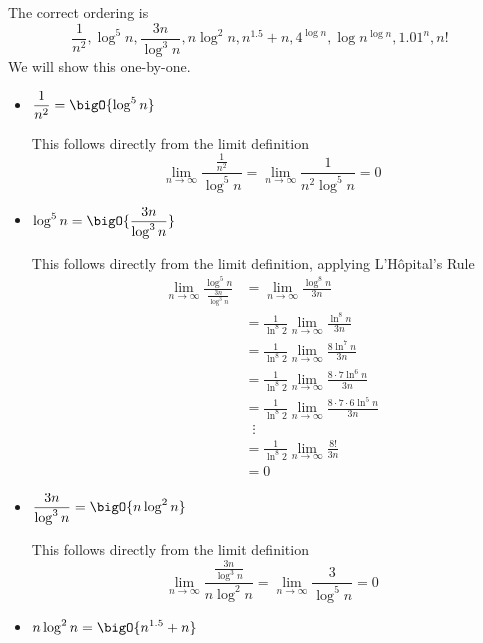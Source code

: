 \documentclass[draft]{article}
\begin{document}
\begin{solution}
    The correct ordering is \[\frac{1}{n^2}, \log^5{n}, \frac{3n}{\log^3{n}}, n\log^2{n}, n^{1.5} + n, 4^{\log{n}}, \log{n}^{\log{n}}, {1.01}^n, n!\]
    We will show this one-by-one.
    \begin{itemize}
        \item $\displaystyle\frac{1}{n^2} = \bigO{\log^5{n}}$

              This follows directly from the limit definition \[\lim_{n\to\infty}\frac{\frac{1}{n^2}}{\log^5{n}} = \lim_{n\to\infty}\frac{1}{n^2\log^5{n}} = 0\]

        \item $\displaystyle\log^5{n} = \bigO{\frac{3n}{\log^3{n}}}$

              This follows directly from the limit definition, applying L'H\^{o}pital's Rule
              \begin{align*}\lim_{n\to\infty}\frac{\log^5{n}}{\frac{3n}{\log^3{n}}}
                   & = \lim_{n\to\infty}\frac{\log^8{n}}{3n}                               \\
                   & = \frac{1}{\ln^8{2}}\lim_{n\to\infty}\frac{\ln^8{n}}{3n}              \\
                   & = \frac{1}{\ln^8{2}}\lim_{n\to\infty}\frac{8\ln^7{n}}{3n}             \\
                   & = \frac{1}{\ln^8{2}}\lim_{n\to\infty}\frac{8\cdot7\ln^6{n}}{3n}       \\
                   & = \frac{1}{\ln^8{2}}\lim_{n\to\infty}\frac{8\cdot7\cdot6\ln^5{n}}{3n} \\
                   & \phantom{..}\vdots                                                    \\
                   & = \frac{1}{\ln^8{2}}\lim_{n\to\infty}\frac{8!}{3n}                    \\
                   & = 0
              \end{align*}

        \item $\displaystyle \frac{3n}{\log^3{n}} = \bigO{n\log^2{n}}$

              This follows directly from the limit definition \[\lim_{n\to\infty}\frac{\frac{3n}{\log^3{n}}}{n\log^2{n}} = \lim_{n\to\infty}\frac{3}{\log^5{n}} = 0\]

        \item $\displaystyle n\log^2{n} =\bigO{n^{1.5} + n}$


\end{itemize}
\end{solution}
\end{document}
